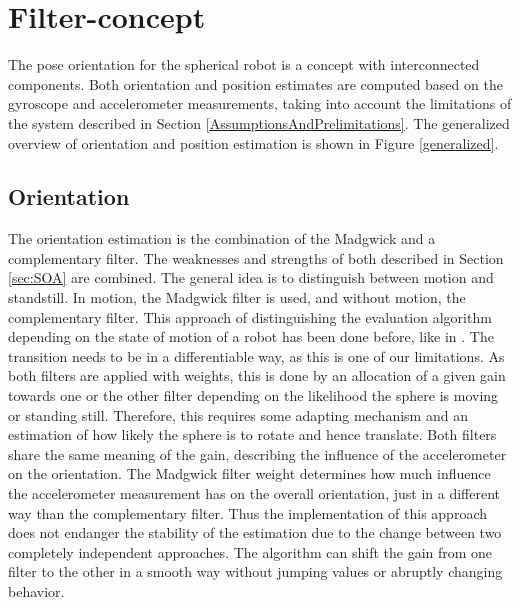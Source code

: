 \documentclass[letterpaper, 10 pt, conference]{ieeeconf}  %
\begin{document}
\section{Filter-concept}
The pose orientation for the spherical robot is a concept with interconnected components.
Both orientation and position estimates are computed based on the gyroscope and accelerometer measurements, taking into account the limitations of the system described in Section \ref{AssumptionsAndPrelimitations}.
The generalized overview of orientation and position estimation is shown in Figure \ref{generalized}.

\subsection{Orientation}
The orientation estimation is the combination of the Madgwick and a complementary filter.
The weaknesses and strengths of both described in Section \ref{sec:SOA} are combined. 
The general idea is to distinguish between motion and standstill.
In motion, the Madgwick filter is used, and without motion, the complementary filter.
This approach of distinguishing the evaluation algorithm depending on the state of motion of a robot has been done before, like in \cite{Hertzberg2012}.
The transition needs to be in a differentiable way, as this is one of our limitations.  
As both filters are applied with weights, this is done by an allocation of a given gain towards one or the other filter depending on the likelihood the sphere is moving or standing still. 
Therefore, this requires some adapting mechanism and an estimation of how likely the sphere is to rotate and hence translate.
Both filters share the same meaning of the gain, describing the influence of the accelerometer on the orientation.
The Madgwick filter weight determines how much influence the accelerometer measurement has on the overall orientation, just in a different way than the complementary filter.
Thus the implementation of this approach does not endanger the stability of the estimation due to the change between two completely independent approaches.
The algorithm can shift the gain from one filter to the other in a smooth way without jumping values or abruptly changing behavior. 
\end{document}

